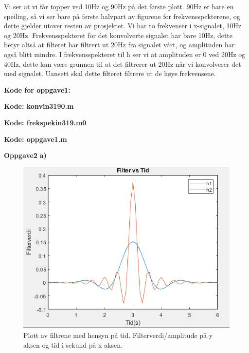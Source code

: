 \documentclass[11pt]{article}
\begin{document}
Vi ser at vi får topper ved 10Hz og 90Hz på det første plott. 90Hz er bare en speiling, så vi ser bare på første halvpart av figurene for frekvensspekterene, og dette gjelder utover resten av prosjektet. Vi har to frekvenser i x-signalet, 10Hz og 20Hz. Frekvensspekteret for det konvolverte signalet har bare 10Hz, dette betyr altså at filteret har filtrert ut 20Hz fra signalet vårt, og amplituden har også blitt mindre. I frekvensspekteret til h ser vi at amplituden er 0 ved 20Hz og 40Hz, dette kan være grunnen til at det filtrerer ut 20Hz når vi konvolverer det med signalet. Uansett skal dette filteret filtrere ut de høye frekvensene.

\textbf{Kode for oppgave1:}

\textbf{Kode: konvin3190.m}
 
\textbf{Kode: frekspekin319.m0}

\textbf{Kode: oppgave1.m}

\textbf{Oppgave2}
\textbf{a)}
\begin{figure}[H]
\includegraphics[scale=0.9]{2a_firtid.png}
\caption{Plott av filtrene med hensyn på tid. Filterverdi/amplitude på y aksen og tid i sekund på x aksen.}
\end{figure}
\end{document}

